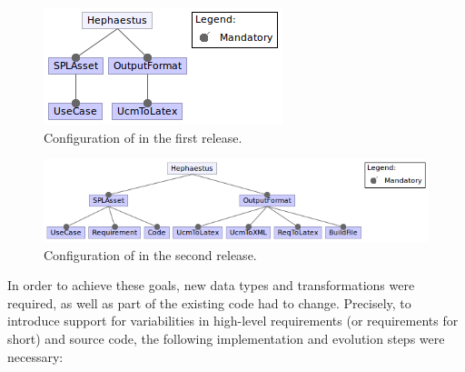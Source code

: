 
\begin{figure}[bth]
\begin{center}
\includegraphics[scale=0.6]{imagens/conf1a-hp.png}
\caption{Configuration of \hp{} in the first release.}
\label{fig:hephaestus-conf1a}
\end{center}
\end{figure}


\begin{figure}[bth]
\begin{center}
\includegraphics[scale=0.6]{imagens/conf1b-hp.png}
\caption{Configuration of \hp{} in the second release.}
\label{fig:hephaestus-conf1b}
\end{center}
\end{figure}


In order to achieve these goals, new data types and transformations
were required, as well as part of the existing code had to
change. Precisely, to introduce support for variabilities in
high-level requirements (or requirements for short) and source code,
the following implementation and evolution steps were necessary:

